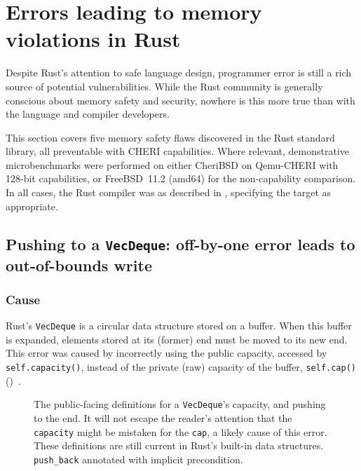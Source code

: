 \documentclass[dissertation.tex]{subfiles}
\begin{document}
\section{Errors leading to memory violations in Rust}
\label{sec:eval-bugs}

Despite Rust's attention to safe language design, programmer error is
still a rich source of potential vulnerabilities.
While the Rust community is generally conscious about memory safety and
security, nowhere is this more true than with the language and compiler
developers.

This section covers five memory safety flaws discovered in the Rust
standard library, all preventable with CHERI capabilities.
Where relevant, demonstrative microbenchmarks were performed on either
CheriBSD on Qemu-CHERI with 128-bit capabilities, or FreeBSD~11.2
(amd64) for the non-capability comparison.
In all cases, the Rust compiler was as described in
, specifying the target as appropriate.


\subsection{Pushing to a \texttt{VecDeque}: off-by-one error leads to out-of-bounds write}
\label{sec:eval-micro-push}

\subsubsection{Cause}
Rust's \texttt{VecDeque} is a circular data structure stored on a
buffer.
When this buffer is expanded, elements stored at its (former) end must
be moved to its new end.
This error was caused by incorrectly using the public capacity, accessed
by \texttt{self.capacity()}, instead of the private (raw) capacity of
the buffer, \texttt{self.cap()}
()~\cite{rust-pr-reserve,rust-issue-deque-append}.

\begin{figure}[ht]
    
    \caption{
        The public-facing definitions for a \texttt{VecDeque}'s
        capacity, and pushing to the end.
        It will not escape the reader's attention that the
        \texttt{capacity} might be mistaken for the \texttt{cap}, a
        likely cause of this error.
        These definitions are still current in Rust's built-in data
        structures.
        \texttt{push\_back} annotated with implicit precondition.
    }
    \label{lst:deque-defs}
\end{figure}
\end{document}
